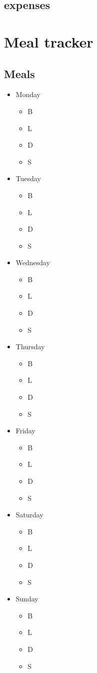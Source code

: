 \documentclass[a4paper]{article}
\begin{document}
\subsection{expenses}
\newpage
\section{Meal tracker}
\subsection{Meals}
\begin{itemize}
  \item Monday
		\begin{itemize}
     \item B
     \item L
     \item D
     \item S
     \end{itemize}
  \item Tuesday
		\begin{itemize}
     \item B
     \item L
     \item D
     \item S
     \end{itemize}
  \item Wednesday
		\begin{itemize}
     \item B
     \item L
     \item D
     \item S
     \end{itemize}
	\item Thursday
		\begin{itemize}
     \item B
     \item L
     \item D
     \item S
     \end{itemize}
	\item Friday
		\begin{itemize}
     \item B
     \item L
     \item D
     \item S
     \end{itemize}
	\item Saturday
		\begin{itemize}
     \item B
     \item L
     \item D
     \item S
     \end{itemize}
	\item	Sunday
		\begin{itemize}
     \item B
     \item L
     \item D
     \item S
     \end{itemize}
\end{itemize}
\newpage
\end{document}
